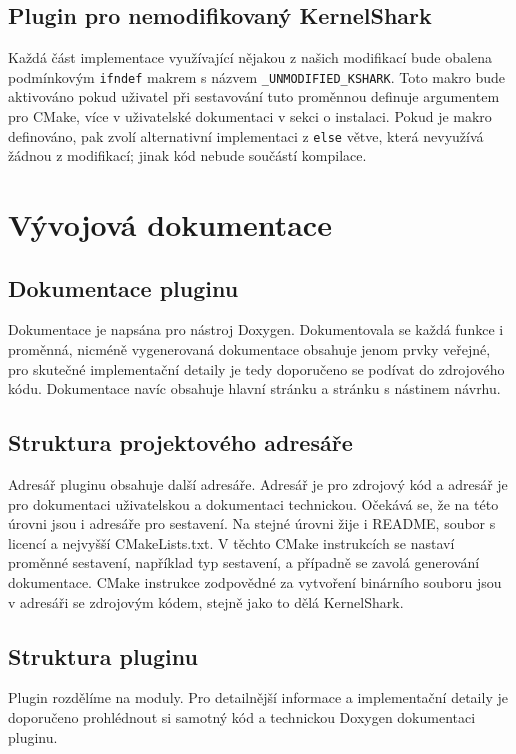 \subsection{Plugin pro nemodifikovaný KernelShark}

Každá část implementace využívající nějakou z našich modifikací bude obalena podmínkovým \texttt{ifndef} makrem s názvem \texttt{\_UNMODIFIED\_KSHARK}. Toto makro bude aktivováno pokud uživatel při sestavování tuto proměnnou definuje argumentem pro CMake, více v uživatelské dokumentaci v sekci o instalaci. Pokud je makro definováno, pak zvolí alternativní implementaci z \texttt{else} větve, která nevyužívá žádnou z modifikací; jinak kód nebude součástí kompilace.

\section{Vývojová dokumentace}

\subsection*{Dokumentace pluginu}
Dokumentace je napsána pro nástroj Doxygen. Dokumentovala se každá funkce i proměnná, nicméně vygenerovaná dokumentace obsahuje jenom prvky veřejné, pro skutečné implementační detaily je tedy doporučeno se podívat do zdrojového kódu. Dokumentace navíc obsahuje hlavní stránku a stránku s nástinem návrhu.

\subsection*{Struktura projektového adresáře}

Adresář pluginu obsahuje další adresáře. Adresář  je pro zdrojový kód a adresář  je pro dokumentaci uživatelskou a dokumentaci technickou. Očekává se, že na této úrovni jsou i adresáře pro sestavení. Na stejné úrovni žije i README, soubor s licencí a nejvyšší CMakeLists.txt. V těchto CMake instrukcích se nastaví proměnné sestavení, například typ sestavení, a případně se zavolá generování dokumentace. CMake instrukce zodpovědné za vytvoření binárního souboru jsou v adresáři se zdrojovým kódem, stejně jako to dělá KernelShark.

\subsection*{Struktura pluginu}
Plugin rozdělíme na moduly. Pro detailnější informace a implementační detaily je doporučeno prohlédnout si samotný kód a technickou Doxygen dokumentaci pluginu.

